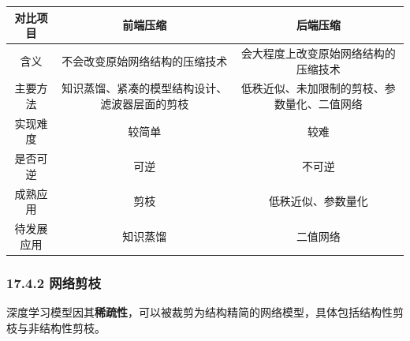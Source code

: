 \begin{longtable}[]{ ccc }
\toprule
对比项目 & 前端压缩 & 后端压缩\tabularnewline
\midrule
\endhead
含义 & 不会改变原始网络结构的压缩技术 &
会大程度上改变原始网络结构的压缩技术\tabularnewline
主要方法 & 知识蒸馏、紧凑的模型结构设计、滤波器层面的剪枝 &
低秩近似、未加限制的剪枝、参数量化、二值网络\tabularnewline
实现难度 & 较简单 & 较难\tabularnewline
是否可逆 & 可逆 & 不可逆\tabularnewline
成熟应用 & 剪枝 & 低秩近似、参数量化\tabularnewline
待发展应用 & 知识蒸馏 & 二值网络\tabularnewline
\bottomrule
\end{longtable}

\subsubsection{17.4.2 网络剪枝}\label{ux7f51ux7edcux526aux679d}

深度学习模型因其\textbf{稀疏性}，可以被裁剪为结构精简的网络模型，具体包括结构性剪枝与非结构性剪枝。

